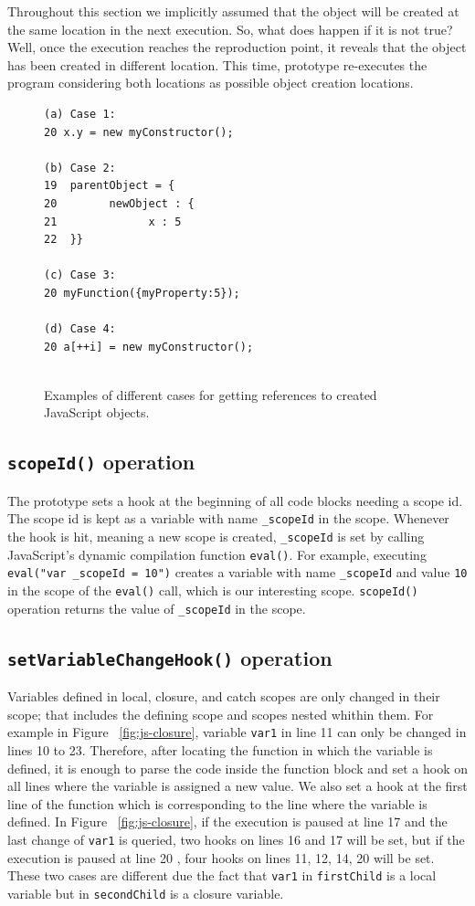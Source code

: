 \documentclass[runningheads,a4paper]{llncs}
\begin{document}
Throughout this section we implicitly assumed that the object will be created at 
the same location in the next execution. So, what does happen if it
is not true? Well, once the execution reaches the reproduction point, it
reveals that the object has been created in different location. This time,
prototype re-executes the program considering both locations as possible 
object creation locations.


\begin{figure}[htp]
\begin{verbatim}
(a) Case 1:
20 x.y = new myConstructor();

(b) Case 2:
19  parentObject = {
20   	  newObject : {
21  			x : 5
22  }}

(c) Case 3:
20 myFunction({myProperty:5});

(d) Case 4:
20 a[++i] = new myConstructor();
 
\end{verbatim}
\caption{Examples of different cases for getting references to created JavaScript objects.}
\label{fig:objectCreation}
\end{figure}

\subsection{\texttt{scopeId()} operation}
The prototype sets a hook at the beginning of all code blocks needing
a scope id. The scope id is kept as a variable with name 
\texttt{\_scopeId} in the scope. Whenever the hook is hit,  meaning a new scope
is created, \texttt{\_scopeId} is set by calling JavaScript's dynamic compilation 
function \texttt{eval()}. For example, executing \texttt{eval("var \_scopeId = 10")} creates a
variable with name \texttt{\_scopeId} and value \texttt{10} in the
scope of the \texttt{eval()} call, which is our interesting scope. \texttt{scopeId()}
operation returns the value of \texttt{\_scopeId} in the scope.

\subsection{\texttt{setVariableChangeHook()} operation}
Variables defined in local, closure, and catch scopes are only changed in
their scope; that includes the defining scope and scopes nested whithin them.
For example in Figure ~\ref{fig:js-closure}, variable \texttt{var1} in line 11 can only be
changed in lines 10 to 23. Therefore, after locating the function in
which the variable is defined, it is enough to parse the code inside
the function block and set a hook on all lines where the variable is
assigned a new value. 
We also set a hook at the first line of the function which is
corresponding to the line where the variable is defined. In Figure
~\ref{fig:js-closure}, if the execution is paused at line 17 and the
last change of \texttt{var1} is queried, two hooks on lines 16 and 17
will be set, but if the execution is paused at line 20 , four hooks on
lines 11, 12, 14, 20 will be set. These two cases are different due
the fact that \texttt{var1} in \texttt{firstChild} is a local variable
but in \texttt{secondChild} is a closure variable.
\end{document}
